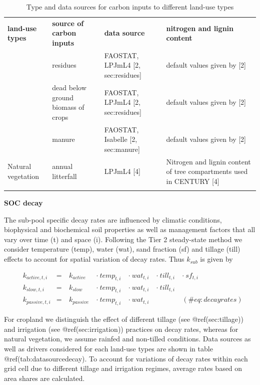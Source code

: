 \documentclass[gc, manuscript]{copernicus}
\begin{document}
 \begin{table}[h]
 \caption{Type and data sources for carbon inputs to different land-use types }
 \begin{tabular}{l l l l}
 \tophline
  \textbf{land-use types}   & \textbf{source of carbon inputs} & \textbf{data source} & \textbf{nitrogen and lignin content} \\
 \middlehline
 \multirow{3}{*}{Cropland} & residues & FAOSTAT, LPJmL4 [2, sec:residues] & default values given by [2]  \\
                            & dead below ground biomass of crops & FAOSTAT, LPJmL4 [2, sec:residues] & default values given by [2] \\
                            & manure & FAOSTAT, Isabelle [2, sec:manure] & default values given by [2] \\
                            \hline
  Natural vegetation        & annual litterfall & LPJmL4 [4]& \begin{minipage}[t]{0.28\columnwidth}\raggedright\strut Nitrogen and lignin content of tree compartments used in CENTURY [4] \strut \end{minipage}\tabularnewline
 \bottomhline
 \end{tabular}
 \label{tab:datasourceinputs}
 \belowtable{}
 \end{table}

\textbf{SOC decay}

The sub-pool specific decay rates are influenced by climatic conditions,
biophysical and biochemical soil properties as well as management
factors that all vary over time (t) and space (i). Following the Tier 2
steady-state method we consider temperature (temp), water (wat), sand
fraction (sf) and tillage (till) effects to account for spatial
variation of decay rates. Thus \(k_{sub}\) is given by

\begin{equation}
\begin{aligned}
& k_{active,t,i}  & = &~ k_{active}  ~ &\cdot~ temp_{t,i} ~ &\cdot~ wat_{t,i} ~ &\cdot~ till_{t,i} ~ & \cdot~ sf_{t,i}\\
& k_{slow,t,i}    & = &~ k_{slow}    ~ &\cdot~ temp_{t,i} ~ &\cdot~ wat_{t,i} ~ &\cdot~ till_{t,i} ~ &\\
& k_{passive,t,i} & = &~ k_{passive} ~ &\cdot~ temp_{t,i} ~ &\cdot~ wat_{t,i} ~ & ~ &
(\#eq:decayrates)
\end{aligned}
\end{equation}

For cropland we distinguish the effect of different tillage (see
@ref(sec:tillage)) and irrigation (see @ref(sec:irrigation)) practices
on decay rates, whereas for natural vegetation, we assume rainfed and
non-tilled conditions. Data sources as well as drivers considered for
each land-use types are shown in table @ref(tab:datasourcedecay). To
account for variations of decay rates within each grid cell due to
different tillage and irrigation regimes, average rates based on area
shares are calculated.
\end{document}
